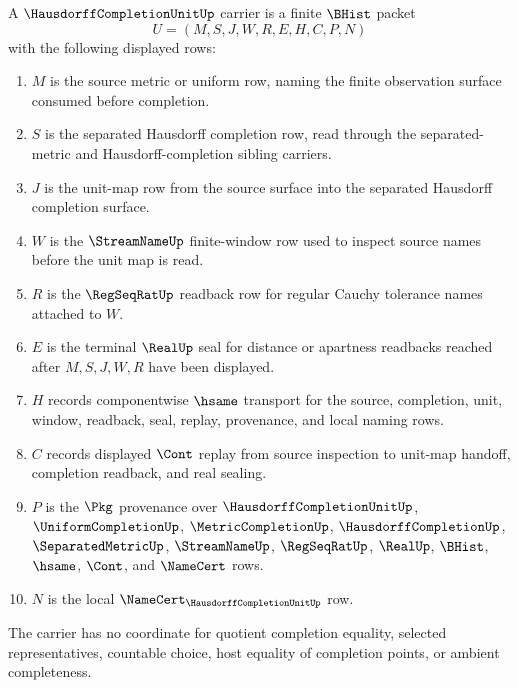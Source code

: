 \begin{definition}
\label{def:hausdorff-completion-unit-carrier}
A $\HausdorffCompletionUnitUp$ carrier is a finite $\BHist$ packet
$$
U=(M,S,J,W,R,E,H,C,P,N)
$$
with the following displayed rows:
\begin{enumerate}
\item $M$ is the source metric or uniform row, naming the finite observation surface consumed before completion.
\item $S$ is the separated Hausdorff completion row, read through the separated-metric and Hausdorff-completion sibling carriers.
\item $J$ is the unit-map row from the source surface into the separated Hausdorff completion surface.
\item $W$ is the $\StreamNameUp$ finite-window row used to inspect source names before the unit map is read.
\item $R$ is the $\RegSeqRatUp$ readback row for regular Cauchy tolerance names attached to $W$.
\item $E$ is the terminal $\RealUp$ seal for distance or apartness readbacks reached after $M,S,J,W,R$ have been displayed.
\item $H$ records componentwise $\hsame$ transport for the source, completion, unit, window, readback, seal, replay, provenance, and local naming rows.
\item $C$ records displayed $\Cont$ replay from source inspection to unit-map handoff, completion readback, and real sealing.
\item $P$ is the $\Pkg$ provenance over $\HausdorffCompletionUnitUp$, $\UniformCompletionUp$, $\MetricCompletionUp$, $\HausdorffCompletionUp$, $\SeparatedMetricUp$, $\StreamNameUp$, $\RegSeqRatUp$, $\RealUp$, $\BHist$, $\hsame$, $\Cont$, and $\NameCert$ rows.
\item $N$ is the local $\NameCert_{\HausdorffCompletionUnitUp}$ row.
\end{enumerate}
The carrier has no coordinate for quotient completion equality, selected representatives, countable choice, host equality of completion points, or ambient completeness.
\end{definition}


